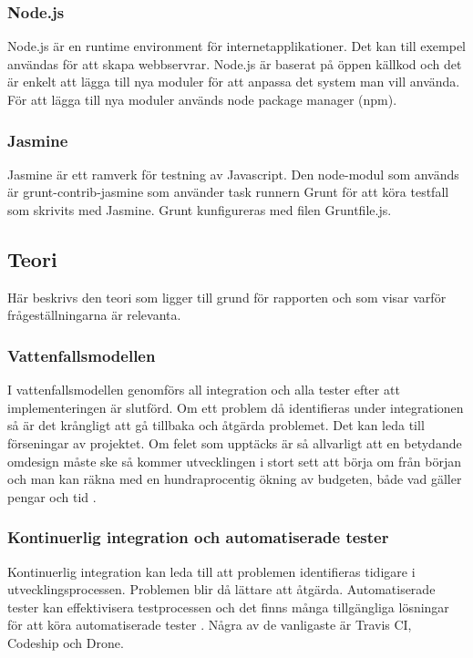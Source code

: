 \subsubsection{Node.js}
Node.js är en runtime environment för internetapplikationer. Det kan till exempel 
användas för att skapa webbservrar.
Node.js är baserat på öppen källkod och det är enkelt att lägga till nya 
moduler för att anpassa det system man vill
använda. För att lägga till nya moduler används node package manager (npm).

\subsubsection{Jasmine}
Jasmine är ett ramverk för testning av Javascript. 
Den node-modul som används är grunt-contrib-jasmine som använder task runnern Grunt 
för att köra testfall som skrivits med Jasmine.
Grunt kunfigureras med filen Gruntfile.js.

\subsection{Teori}
Här beskrivs den teori som ligger till grund för rapporten och som visar
varför frågeställningarna är relevanta.

\subsubsection{Vattenfallsmodellen}
I vattenfallsmodellen genomförs all integration och alla tester efter att implementeringen är slutförd. 
Om ett problem då identifieras under integrationen så är det krångligt att gå 
tillbaka och åtgärda problemet. 
Det kan leda till förseningar av projektet.
Om felet som upptäcks är så allvarligt att en betydande omdesign måste ske så
kommer utvecklingen i stort sett att börja om från början och man kan räkna 
med en hundraprocentig ökning av budgeten, 
både vad gäller pengar och tid \cite{Royce}.

\subsubsection{Kontinuerlig integration och automatiserade tester}
Kontinuerlig integration kan leda till att problemen identifieras tidigare i 
utvecklingsprocessen. Problemen blir då lättare att åtgärda. Automatiserade tester kan effektivisera 
testprocessen och det finns många tillgängliga lösningar för att köra automatiserade
tester \cite{Karlsson}.
Några av de vanligaste är Travis CI, Codeship och Drone.

